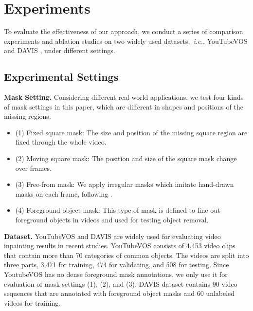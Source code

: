 


\section{Experiments}\label{sec:exp}
To evaluate the effectiveness of our approach, we conduct a series of comparison experiments and ablation studies on two widely used datasets,~\emph{i.e.,} YouTubeVOS \cite{xu2018Youtube} and DAVIS \cite{davis_2017}, under different settings.

\subsection{Experimental Settings}
\noindent \textbf{Mask Setting.} Considering different real-world applications, we test four kinds of mask settings in this paper, which are different in shapes and positions of the missing regions. 
\begin{itemize}
\item (1) Fixed square mask: The size and position of the missing square region are fixed through the whole video. 
\item (2) Moving square mask: The position and size of the square mask change over frames. 
\item (3) Free-from mask: We apply irregular masks which imitate hand-drawn masks on each frame, following \cite{liu2018partialinpainting}. 
\item (4) Foreground object mask: This type of mask is defined to line out foreground objects in videos and used for testing object removal.
\end{itemize}

\noindent\textbf{Dataset.} 
YouTubeVOS and DAVIS are widely used for evaluating video inpainting results in recent studies.
YouTubeVOS consists of 4,453 video clips that contain more than 70 categories of common objects. 
The videos are split into three parts, 3,471 for training, 474 for validating, and 508 for testing. Since YoutubeVOS has no dense foreground mask annotations, we only use it for evaluation of mask settings (1), (2), and (3). 
% 
DAVIS dataset contains 90 video sequences that are annotated with foreground object masks and 60 unlabeled videos for training.

